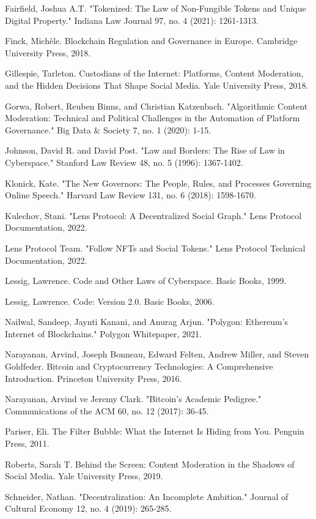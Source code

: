 \documentclass[11pt,a4paper]{article}
\begin{document}
Fairfield, Joshua A.T. "Tokenized: The Law of Non-Fungible Tokens and Unique Digital Property." Indiana Law Journal 97, no. 4 (2021): 1261-1313.

Finck, Michèle. Blockchain Regulation and Governance in Europe. Cambridge University Press, 2018.

Gillespie, Tarleton. Custodians of the Internet: Platforms, Content Moderation, and the Hidden Decisions That Shape Social Media. Yale University Press, 2018.

Gorwa, Robert, Reuben Binns, and Christian Katzenbach. "Algorithmic Content Moderation: Technical and Political Challenges in the Automation of Platform Governance." Big Data & Society 7, no. 1 (2020): 1-15.

Johnson, David R. and David Post. "Law and Borders: The Rise of Law in Cyberspace." Stanford Law Review 48, no. 5 (1996): 1367-1402.

Klonick, Kate. "The New Governors: The People, Rules, and Processes Governing Online Speech." Harvard Law Review 131, no. 6 (2018): 1598-1670.

Kulechov, Stani. "Lens Protocol: A Decentralized Social Graph." Lens Protocol Documentation, 2022.

Lens Protocol Team. "Follow NFTs and Social Tokens." Lens Protocol Technical Documentation, 2022.

Lessig, Lawrence. Code and Other Laws of Cyberspace. Basic Books, 1999.

Lessig, Lawrence. Code: Version 2.0. Basic Books, 2006.

Nailwal, Sandeep, Jaynti Kanani, and Anurag Arjun. "Polygon: Ethereum's Internet of Blockchains." Polygon Whitepaper, 2021.

Narayanan, Arvind, Joseph Bonneau, Edward Felten, Andrew Miller, and Steven Goldfeder. Bitcoin and Cryptocurrency Technologies: A Comprehensive Introduction. Princeton University Press, 2016.

Narayanan, Arvind ve Jeremy Clark. "Bitcoin's Academic Pedigree." Communications of the ACM 60, no. 12 (2017): 36-45.

Pariser, Eli. The Filter Bubble: What the Internet Is Hiding from You. Penguin Press, 2011.

Roberts, Sarah T. Behind the Screen: Content Moderation in the Shadows of Social Media. Yale University Press, 2019.

Schneider, Nathan. "Decentralization: An Incomplete Ambition." Journal of Cultural Economy 12, no. 4 (2019): 265-285.
\end{document}
